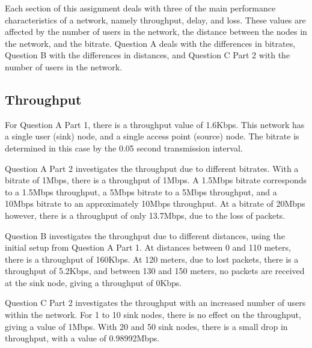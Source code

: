 Each section of this assignment deals with three of the main performance
characteristics of a network, namely throughput, delay, and loss. These values
are affected by the number of users in the network, the distance between the
nodes in the network, and the bitrate. Question A deals with the differences in
bitrates, Question B with the differences in distances, and Question C Part 2
with the number of users in the network.

\subsection{Throughput}

For Question A Part 1, there is a throughput value of 1.6Kbps. This network has
a single user (sink) node, and a single access point (source) node. The bitrate
is determined in this case by the 0.05 second transmission interval.

\par Question A Part 2 investigates the throughput due to different bitrates.
With a bitrate of 1Mbps, there is a throughput of 1Mbps. A 1.5Mbps bitrate
corresponds to a 1.5Mbps throughput, a 5Mbps bitrate to a 5Mbps throughput, and
a 10Mbps bitrate to an approximately 10Mbps throughput. At a bitrate of 20Mbps
however, there is a throughput of only 13.7Mbps, due to the loss of packets.

\par Question B investigates the throughput due to different distances, using
the initial setup from Question A Part 1. At distances between 0 and 110 meters,
there is a throughput of 160Kbps. At 120 meters, due to lost packets, there is a
throughput of 5.2Kbps, and between 130 and 150 meters, no packets are received
at the sink node, giving a throughput of 0Kbps.

\par Question C Part 2 investigates the throughput with an increased number of
users within the network. For 1 to 10 sink nodes, there is no effect on the
throughput, giving a value of 1Mbps. With 20 and 50 sink nodes, there is a small
drop in throughput, with a value of 0.98992Mbps.

